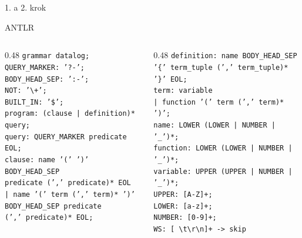 \documentclass[11pt,aspectratio=169]{beamer}
\begin{document}
\begin{frame}{1. a 2. krok}
    \begin{center}
        ANTLR
    \end{center}
    
    \begin{columns}[T,onlytextwidth]
        \begin{column}{0.48\textwidth}
            \footnotesize
            \texttt{grammar datalog;\\
                    QUERY\_MARKER: '?-';\\
                    BODY\_HEAD\_SEP: ':-';\\
                    NOT: '\textbackslash+';\\
                    BUILT\_IN: '\$';\\
                    program: (clause | definition)* query;\\
                    query: QUERY\_MARKER predicate EOL;\\
                    clause: name '(' ')' BODY\_HEAD\_SEP\\
                    \hspace{2em} predicate (',' predicate)* EOL\\
                    \hspace{1em} | name '(' term (',' term)* ')' \\
                    \hspace{2em} BODY\_HEAD\_SEP predicate\\
                    \hspace{2em} (',' predicate)* EOL;
            }
        \end{column}
        \begin{column}{0.48\textwidth}
            \footnotesize
            \texttt{definition: name BODY\_HEAD\_SEP\\
                \hspace{2em} '\{' term\_tuple (',' term\_tuple)* '\}' EOL;\\
                term: variable\\
                \hspace{1em} | function '(' term (',' term)* ')';\\
                name: LOWER (LOWER | NUMBER | '\_')*;\\
                function: LOWER (LOWER | NUMBER | '\_')*;\\
                variable: UPPER (UPPER | NUMBER | '\_')*;\\
                UPPER: [A-Z]+;\\
                LOWER: [a-z]+;\\
                NUMBER: [0-9]+;\\
                WS: [ \textbackslash t\textbackslash r\textbackslash n]+ -\textgreater\ skip\\
            }
        \end{column}
    \end{columns}
\end{frame}
\end{document}
